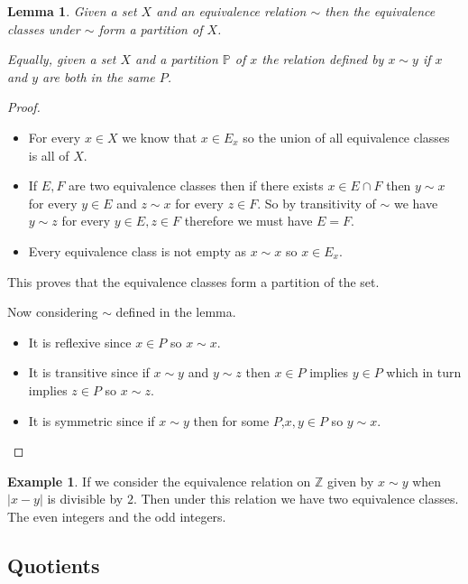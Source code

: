 \documentclass[
]{book}
\newtheorem{lemma}{Lemma}[chapter]
\theoremstyle{definition}
\theoremstyle{definition}
\newtheorem{example}{Example}[chapter]
\theoremstyle{definition}
\theoremstyle{definition}
\theoremstyle{remark}
\begin{document}
\begin{lemma}
Given a set \(X\) and an equivalence relation \(\sim\) then the equivalence classes under \(\sim\) form a partition of \(X\).

Equally, given a set \(X\) and a partition \(\mathbb{P}\) of \(x\) the relation defined by \(x \sim y\) if \(x\) and \(y\) are both in the same \(P\).
\end{lemma}

\begin{proof}

\begin{itemize}
\item
  For every \(x \in X\) we know that \(x \in E_x\) so the union of all equivalence classes is all of \(X\).
\item
  If \(E, F\) are two equivalence classes then if there exists \(x \in E \cap F\) then \(y \sim x\) for every \(y \in E\) and \(z \sim x\) for every \(z \in F\). So by transitivity of \(\sim\) we have \(y \sim z\) for every \(y \in E, z \in F\) therefore we must have \(E=F\).
\item
  Every equivalence class is not empty as \(x \sim x\) so \(x \in E_x\).
\end{itemize}

This proves that the equivalence classes form a partition of the set.

Now considering \(\sim\) defined in the lemma.

\begin{itemize}
\item
  It is reflexive since \(x \in P\) so \(x \sim x\).
\item
  It is transitive since if \(x \sim y\) and \(y \sim z\) then \(x \in P\) implies \(y \in P\) which in turn implies \(z \in P\) so \(x \sim z\).
\item
  It is symmetric since if \(x \sim y\) then for some \(P\),\(x, y \in P\) so \(y \sim x\).
\end{itemize}

\end{proof}

\begin{example}
If we consider the equivalence relation on \(\mathbb{Z}\) given by \(x \sim y\) when \(|x-y|\) is divisible by \(2\). Then under this relation we have two equivalence classes. The even integers and the odd integers.
\end{example}

\subsection{Quotients}\label{quotients}
\end{document}
